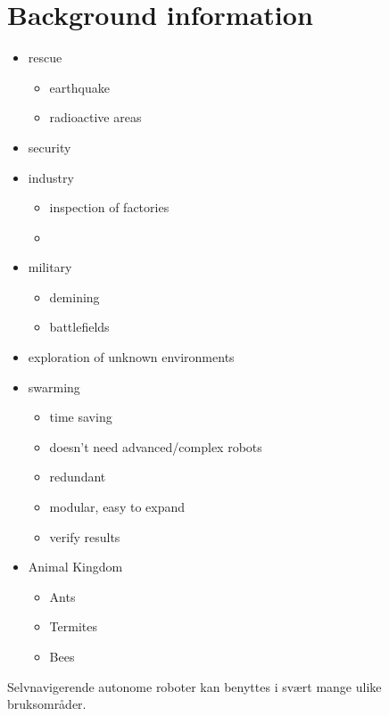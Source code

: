 \section{Background information}
\begin{itemize}
    \item rescue
    \begin{itemize}
        \item earthquake
        \item radioactive areas
    \end{itemize}
    \item security
    \item industry
    \begin{itemize}
        \item inspection of factories
        \item 
    \end{itemize}
    \item military
    \begin{itemize}
        \item demining
        \item battlefields
    \end{itemize}
    \item exploration of unknown environments
    \item swarming
    \begin{itemize}
        \item time saving
        \item doesn't need advanced/complex robots
        \item redundant
        \item modular, easy to expand
        \item verify results
    \end{itemize}
    \item Animal Kingdom
    \begin{itemize}
        \item Ants
        \item Termites
        \item Bees
    \end{itemize}
\end{itemize}



Selvnavigerende autonome roboter kan benyttes i svært mange ulike bruksområder.

